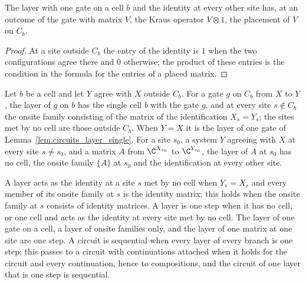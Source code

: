 \begin{lemma}
    \label{lem:circuits_layer_single}
    \leanok
    The layer with one gate on a cell $b$ and the identity at every other site has,
    at an outcome of the gate with matrix $V$, the Kraus operator $V\otimes1$, the
    placement of $V$ on $C_b$.
\end{lemma}
\begin{proof}\leanok
    At a site outside $C_b$ the entry of the identity is $1$ when the two
    configurations agree there and $0$ otherwise; the product of these entries is
    the condition in the formula for the entries of a placed matrix.
\end{proof}

\begin{definition}
    \label{def:circuits_gate_at}
    \leanok
    Let $b$ be a cell and let $Y$ agree with $X$ outside $C_b$. For a gate $g$ on
    $C_b$ from $X$ to $Y$, the layer of $g$ on $b$ has the single cell $b$ with the gate
    $g$, and at every site $s\notin C_b$ the onsite family consisting of the matrix of
    the identification $X_s=Y_s$; the sites met by no cell are those outside $C_b$.
    When $Y=X$ it is the layer of one gate of Lemma~\ref{lem:circuits_layer_single}.
    For a site $s_0$, a system $Y$ agreeing with $X$ at every site $s\neq s_0$, and a
    matrix $A$ from $\C^{X_{s_0}}$ to $\C^{Y_{s_0}}$, the layer of $A$ at $s_0$ has no
    cell, the onsite family $\{A\}$ at $s_0$ and the identification at every other site.

    A layer acts as the identity at a site $s$ met by no cell when $Y_s=X_s$ and every
    member of its onsite family at $s$ is the identity matrix; this holds when the onsite
    family at $s$ consists of identity matrices. A layer is one step when it has no cell,
    or one cell and acts as the identity at every site met by no cell. The layer of one
    gate on a cell, a layer of onsite families only, and the layer of one matrix at one
    site are one step. A circuit is sequential when every layer of every branch is one
    step; this passes to a circuit with continuations attached when it holds for the
    circuit and every continuation, hence to compositions, and the circuit of one layer
    that is one step is sequential.
\end{definition}

